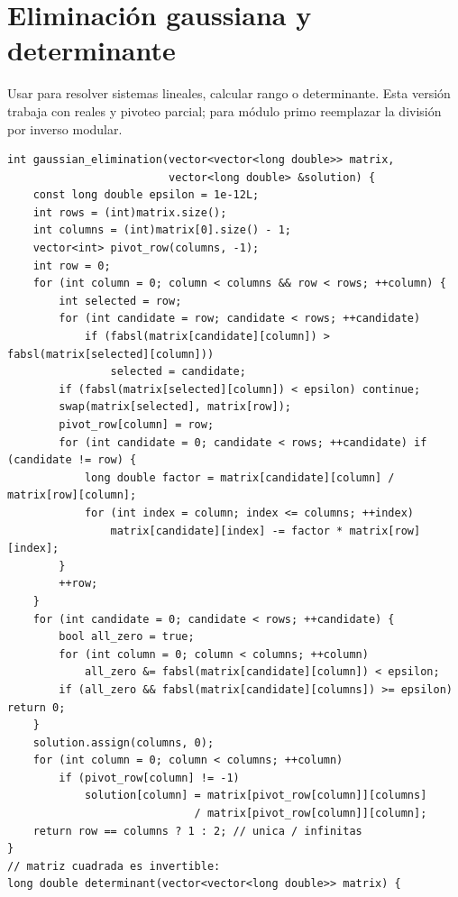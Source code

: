 \section{Eliminaci\'on gaussiana y determinante}

Usar para resolver sistemas lineales, calcular rango o determinante. Esta
versi\'on trabaja con reales y pivoteo parcial; para m\'odulo primo reemplazar la
divisi\'on por inverso modular.


\begin{lstlisting}[style=cpp]
int gaussian_elimination(vector<vector<long double>> matrix,
                         vector<long double> &solution) {
    const long double epsilon = 1e-12L;
    int rows = (int)matrix.size();
    int columns = (int)matrix[0].size() - 1;
    vector<int> pivot_row(columns, -1);
    int row = 0;
    for (int column = 0; column < columns && row < rows; ++column) {
        int selected = row;
        for (int candidate = row; candidate < rows; ++candidate)
            if (fabsl(matrix[candidate][column]) > fabsl(matrix[selected][column]))
                selected = candidate;
        if (fabsl(matrix[selected][column]) < epsilon) continue;
        swap(matrix[selected], matrix[row]);
        pivot_row[column] = row;
        for (int candidate = 0; candidate < rows; ++candidate) if (candidate != row) {
            long double factor = matrix[candidate][column] / matrix[row][column];
            for (int index = column; index <= columns; ++index)
                matrix[candidate][index] -= factor * matrix[row][index];
        }
        ++row;
    }
    for (int candidate = 0; candidate < rows; ++candidate) {
        bool all_zero = true;
        for (int column = 0; column < columns; ++column)
            all_zero &= fabsl(matrix[candidate][column]) < epsilon;
        if (all_zero && fabsl(matrix[candidate][columns]) >= epsilon) return 0;
    }
    solution.assign(columns, 0);
    for (int column = 0; column < columns; ++column)
        if (pivot_row[column] != -1)
            solution[column] = matrix[pivot_row[column]][columns]
                             / matrix[pivot_row[column]][column];
    return row == columns ? 1 : 2; // unica / infinitas
}
// matriz cuadrada es invertible:
long double determinant(vector<vector<long double>> matrix) {

\end{lstlisting}
